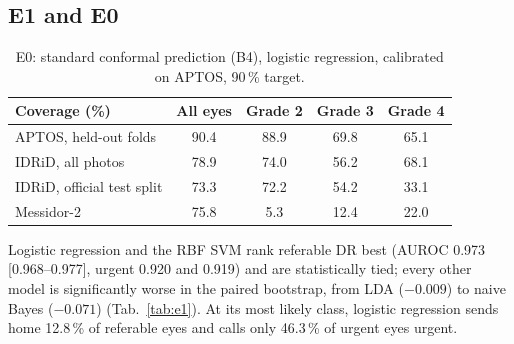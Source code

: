 \documentclass[10pt,twocolumn,letterpaper]{article}
\newcommand{\pct}{\,\%}
\begin{document}
\subsection{E1 and E0}
\begin{table}[t]\centering\small
{}
\caption{E1: 3,662 APTOS photos, pooled out-of-fold predictions of nested 10-fold CV, 95\pct{} group-bootstrap CIs. QWK: quadratic weighted kappa on the five grades.}\label{tab:e1}
\end{table}
\begin{table}[t]\centering\small
\begin{tabular}{@{}lcccc@{}}\toprule
Coverage (\%) & All eyes & Grade 2 & Grade 3 & Grade 4\\\midrule
APTOS, held-out folds & 90.4 & 88.9 & 69.8 & 65.1\\
IDRiD, all photos & 78.9 & 74.0 & 56.2 & 68.1\\
IDRiD, official test split & 73.3 & 72.2 & 54.2 & 33.1\\
Messidor-2 & 75.8 & 5.3 & 12.4 & 22.0\\\bottomrule
\end{tabular}
\caption{E0: standard conformal prediction (B4), logistic regression, calibrated on APTOS, 90\pct{} target.}\label{tab:e0}
\end{table}
Logistic regression and the RBF SVM rank referable DR best (AUROC 0.973 [0.968--0.977], urgent 0.920 and 0.919) and are statistically tied; every other model is significantly worse in the paired bootstrap, from LDA ($-0.009$) to naive Bayes ($-0.071$) (Tab.~\ref{tab:e1}). At its most likely class, logistic regression sends home 12.8\pct{} of referable eyes and calls only 46.3\pct{} of urgent eyes urgent.
\end{document}
